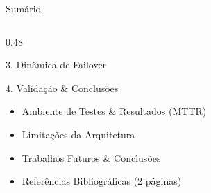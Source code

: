\documentclass[aspectratio=169,10pt]{beamer}
\begin{document}
\begin{frame}{Sumário}
\begin{columns}[t]
\begin{column}{0.48\textwidth}
\begin{block}{3. Dinâmica de Failover}
      \end{block}
      \begin{block}{4. Validação \& Conclusões}
        \begin{itemize}
          \item Ambiente de Testes \& Resultados (MTTR)
          \item Limitações da Arquitetura
          \item Trabalhos Futuros \& Conclusões
          \item Referências Bibliográficas (2 páginas)
        \end{itemize}
      \end{block}
    \end{column}
  \end{columns}
\end{frame}
\end{document}
